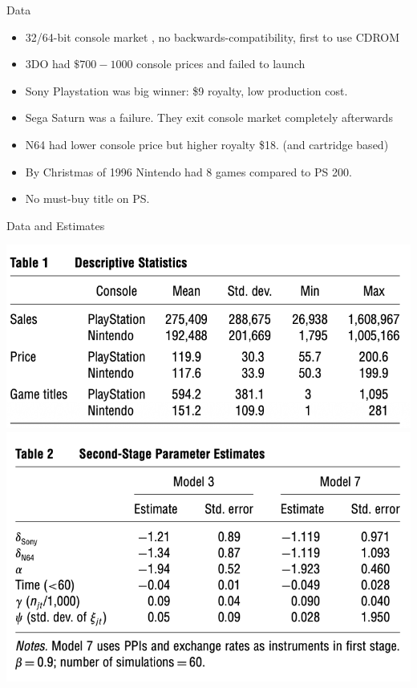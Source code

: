 \begin{frame}{Data}
\begin{itemize}
\item 32/64-bit console market , no backwards-compatibility, first to use CDROM
\item 3DO had $\$700-1000$ console prices and failed to launch
\item Sony Playstation was big winner: \$9 royalty, low production cost.
\item Sega Saturn was a failure. They exit console market completely afterwards
\item N64 had lower console price but higher royalty \$18. (and cartridge based)
\item By Christmas of 1996 Nintendo had 8 games compared to PS 200.
\item No must-buy title on PS.
\end{itemize}
\end{frame}

\begin{frame}{Data and Estimates}
\begin{center}
\includegraphics[scale=0.5]{resources/dube-table1}\\
\includegraphics[scale=0.5]{resources/dube-table2}
\end{center}
\end{frame}

